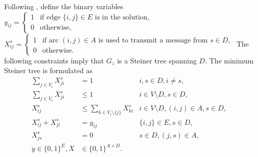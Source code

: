 Following \cite{Haugland12Dual}, define the binary variables
\newline\newline
$y_{ij}=
\begin{cases}
    1 & \text{if edge $\{i,j\} \in E$ is in the solution},\\
    0 & \text{otherwise},
  \end{cases}$
\newline\newline
$X^{s}_{ij}=
\begin{cases}
    1 & \text{if arc $(i,j) \in A$ is used to transmit a message from $s\in D$},\\
    0 & \text{otherwise}.
  \end{cases}$
\newline\newline
The following constraints imply that $G_z$ is a Steiner tree spanning $D$.
The minimum Steiner tree is formulated as
\begin{subequations}\label{mod:x0}
\begin{align}
\label{con:dd:arrowFromDest} \sum\limits_{j\in V_i}X^s_{ji} & = 1 & i,s\in D,i\neq s,\\
\label{con:dd:arrowFromNonDestB} \sum\limits_{j\in V_{i}}X^s_{ji} & \leq 1 & i\in V \setminus D, s\in D,\\
\label{con:dd:arrowFromNonDestA} X^s_{ij} & \leq \sum\limits_{k\in V_{i}\setminus \{j\}}X^s_{ki} & i\in V \setminus D,(i,j)\in A, s\in D,\\
\label{con:dd:oneDir} X^s_{ij} + X^s_{ji} & = y_{ij} & \{i,j\}\in E, s\in D,\\
\label{con:dd:startInSource} X^s_{js} & = 0 &  s\in D, (j,s)\in A,&\\
\label{con:dd:vardim}y \in \{0,1\}^{E}, X & \in \{0,1\}^{A\times D}.
\end{align}~
\end{subequations}

